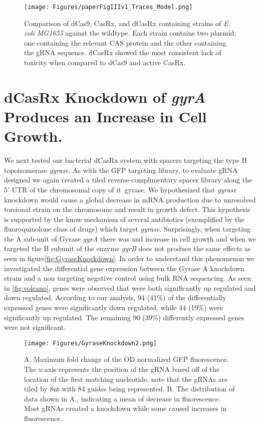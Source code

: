 \documentclass[times]{zHenriquesLab-StyleBioRxiv}
\begin{document}
\begin{figure*}
    \centering
    \texttt{[image: Figures/paperFigIIIv1\_Traces\_Model.png]}
    \caption{Comparison of dCas9, CasRx, and dCasRx containing strains of \textit{E. coli MG1655} against the wildtype. Each strain contains two plasmid, one containing the relevant CAS protein and the other containing the gRNA sequence. dCasRx showed the most consistent lack of toxicity when compared to dCas9 and active CasRx.}
    \label{fig:dCas9CasRxComp}
\end{figure*}

\section*{dCasRx Knockdown of \textit{gyrA} Produces an Increase in Cell Growth.} We next tested our bacterial dCasRx system with spacers targeting the type II topoisomerase {\it gyrase}. As with the GFP targeting library, to evaluate gRNA designed we again created a tiled reverse-complimentary spacer library along the 5' UTR of the chromosomal copy of {it\ gyrase}. We hypothesized that {\it gyrase} knockdown would cause a global decrease in mRNA production due to unresolved torsional strain on the chromosome and result in growth defect. This hypothesis is supported by the know mechanism of several antibiotics (exemplified by the fluoroquinolone class of drugs) which target {\it gyrase}\textsuperscript{\cite{Collin:2011aa}}. Surprisingly, when targeting the A sub-unit of Gyrase {\it gyrA} there was and increase in cell growth and when we targeted the B subunit of the enzyme {\it gyrB} does not produce the same effects as seen in figure\ref{fig:GyraseKnockdown}. In order to understand this phenomenon we investigated the differential gene expression between the Gyrase A knockdown strain and a non targeting negative control using bulk RNA sequencing. As seen in \ref{fig:volcano}, genes were observed that were both significantly up regulated and down regulated. According to our analysis, 94 (41\%) of the differentially expressed genes were significantly down regulated, while 44 (19\%) were significantly up regulated. The remaining 90 (39\%) differently expressed genes were not significant. 

\begin{figure*}[t]
    \centering
    \texttt{[image: Figures/GyraseKnockdown2.png]}
    \caption{A. Maximum fold change of the OD normalized GFP fluorescence. The x-axis represents the position of the gRNA based off of the location of the first matching nucleotide, note that the gRNAs are tiled by 8nt with 84 guides being represented. B. The distribution of data shown in A., indicating a mean of decrease in fluorescence. Most gRNAs created a knockdown while some caused increases in fluorescence.}
    \label{fig:1}
\end{figure*}
\end{document}
